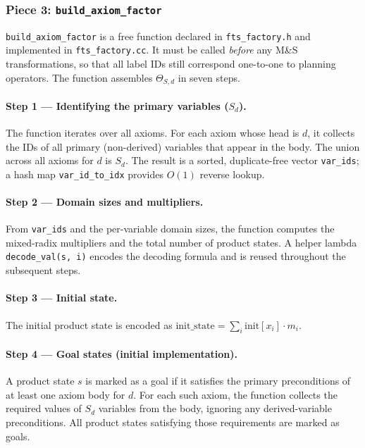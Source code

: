 \documentclass[11pt,a4paper]{article}
\begin{document}
\subsubsection{Piece 3: \texttt{build\_axiom\_factor}}
\label{sec:piece3}

\texttt{build\_axiom\_factor} is a free function declared in
\texttt{fts\_factory.h} and implemented in \texttt{fts\_factory.cc}.  It must
be called \emph{before} any M\&S transformations, so that all label IDs still
correspond one-to-one to planning operators.  The function assembles
$\Theta_{S,d}$ in seven steps.

\paragraph{Step 1 — Identifying the primary variables ($S_d$).}
The function iterates over all axioms.  For each axiom whose head is $d$, it
collects the IDs of all primary (non-derived) variables that appear in the
body.  The union across all axioms for $d$ is $S_d$.  The result is a sorted,
duplicate-free vector \texttt{var\_ids}; a hash map
\texttt{var\_id\_to\_idx} provides $O(1)$ reverse lookup.

\paragraph{Step 2 — Domain sizes and multipliers.}
From \texttt{var\_ids} and the per-variable domain sizes, the function computes
the mixed-radix multipliers and the total number of product states.  A helper
lambda \texttt{decode\_val(s, i)} encodes the decoding formula and is reused
throughout the subsequent steps.

\paragraph{Step 3 — Initial state.}
The initial product state is encoded as
$\mathrm{init\_state} = \sum_i \mathrm{init}[x_i] \cdot m_i$.

\paragraph{Step 4 — Goal states (initial implementation).}
A product state $s$ is marked as a goal if it satisfies the primary
preconditions of at least one axiom body for $d$.  For each such axiom, the
function collects the required values of $S_d$ variables from the body, ignoring
any derived-variable preconditions.  All product states satisfying those
requirements are marked as goals.
\end{document}
